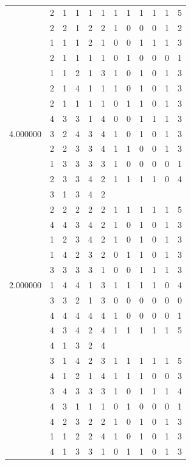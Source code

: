 \documentclass[]{book}
\theoremstyle{definition}
\theoremstyle{definition}
\theoremstyle{definition}
\theoremstyle{remark}
\begin{document}
\begin{table}
{\begin{tabular}[t]{rrrrrrrrrrrr}
 & 2 & 1 & 1 & 1 & 1 & 1 & 1 & 1 & 1 & 1 & 5\\
 & 2 & 2 & 1 & 2 & 2 & 1 & 0 & 0 & 0 & 1 & 2\\
 & 1 & 1 & 1 & 2 & 1 & 0 & 0 & 1 & 1 & 1 & 3\\
 & 2 & 1 & 1 & 1 & 1 & 0 & 1 & 0 & 0 & 0 & 1\\
 & 1 & 1 & 2 & 1 & 3 & 1 & 0 & 1 & 0 & 1 & 3\\
 & 2 & 1 & 4 & 1 & 1 & 1 & 0 & 1 & 0 & 1 & 3\\
 & 2 & 1 & 1 & 1 & 1 & 0 & 1 & 1 & 0 & 1 & 3\\
 & 4 & 3 & 3 & 1 & 4 & 0 & 0 & 1 & 1 & 1 & 3\\
4.000000 & 3 & 2 & 4 & 3 & 4 & 1 & 0 & 1 & 0 & 1 & 3\\
 & 2 & 2 & 3 & 3 & 4 & 1 & 1 & 0 & 0 & 1 & 3\\
 & 1 & 3 & 3 & 3 & 3 & 1 & 0 & 0 & 0 & 0 & 1\\
 & 2 & 3 & 3 & 4 & 2 & 1 & 1 & 1 & 1 & 0 & 4\\
 & 3 & 1 & 3 & 4 & 2 &  &  &  &  &  & \\
 & 2 & 2 & 2 & 2 & 2 & 1 & 1 & 1 & 1 & 1 & 5\\
 & 4 & 4 & 3 & 4 & 2 & 1 & 0 & 1 & 0 & 1 & 3\\
 & 1 & 2 & 3 & 4 & 2 & 1 & 0 & 1 & 0 & 1 & 3\\
 & 1 & 4 & 2 & 3 & 2 & 0 & 1 & 1 & 0 & 1 & 3\\
 & 3 & 3 & 3 & 3 & 1 & 0 & 0 & 1 & 1 & 1 & 3\\
2.000000 & 1 & 4 & 4 & 1 & 3 & 1 & 1 & 1 & 1 & 0 & 4\\
 & 3 & 3 & 2 & 1 & 3 & 0 & 0 & 0 & 0 & 0 & 0\\
 & 4 & 4 & 4 & 4 & 4 & 1 & 0 & 0 & 0 & 0 & 1\\
 & 4 & 3 & 4 & 2 & 4 & 1 & 1 & 1 & 1 & 1 & 5\\
 & 4 & 1 & 3 & 2 & 4 &  &  &  &  &  & \\
 & 3 & 1 & 4 & 2 & 3 & 1 & 1 & 1 & 1 & 1 & 5\\
 & 4 & 1 & 2 & 1 & 4 & 1 & 1 & 1 & 0 & 0 & 3\\
 & 3 & 4 & 3 & 3 & 3 & 1 & 0 & 1 & 1 & 1 & 4\\
 & 4 & 3 & 1 & 1 & 1 & 0 & 1 & 0 & 0 & 0 & 1\\
 & 4 & 2 & 3 & 2 & 2 & 1 & 0 & 1 & 0 & 1 & 3\\
 & 1 & 1 & 2 & 2 & 4 & 1 & 0 & 1 & 0 & 1 & 3\\
 & 4 & 1 & 3 & 3 & 1 & 0 & 1 & 1 & 0 & 1 & 3\\

\end{tabular}}
\end{table}
\end{document}
